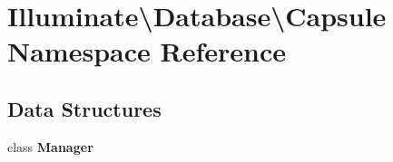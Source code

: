 \section{Illuminate\textbackslash{}Database\textbackslash{}Capsule Namespace Reference}
\label{namespace_illuminate_1_1_database_1_1_capsule}
\subsection*{Data Structures}
\begin{DoxyCompactItemize}
\item 
class {\bf Manager}
\end{DoxyCompactItemize}
